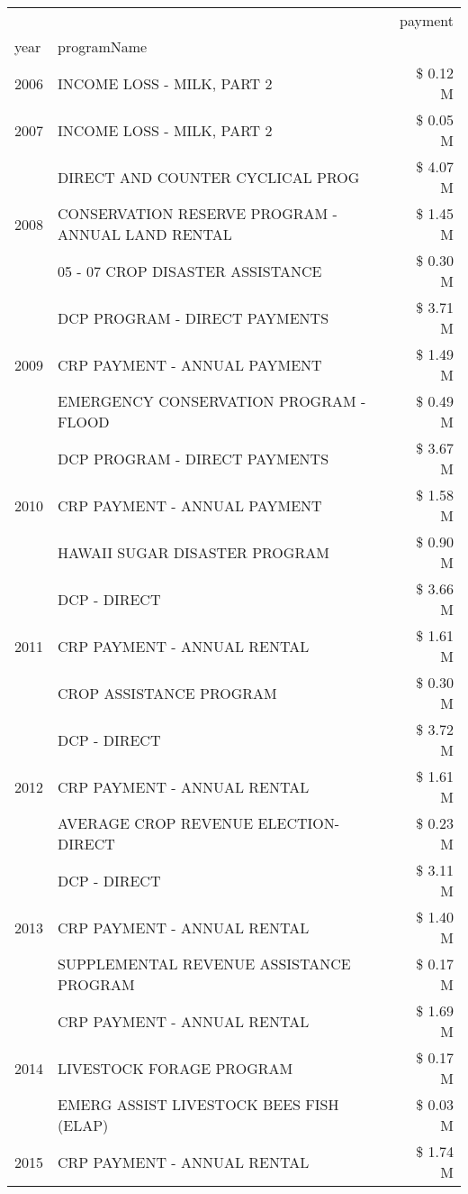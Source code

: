 \begin{tabular}{llr}
\toprule
 &  & payment \\
year & programName &  \\
\midrule
2006 & INCOME LOSS - MILK, PART 2 & \$ 0.12 M \\
\cline{1-3}
2007 & INCOME LOSS - MILK, PART 2 & \$ 0.05 M \\
\cline{1-3}
\multirow[t]{3}{*}{2008} & DIRECT AND COUNTER CYCLICAL PROG & \$ 4.07 M \\
 & CONSERVATION RESERVE PROGRAM - ANNUAL LAND RENTAL & \$ 1.45 M \\
 & 05 - 07 CROP DISASTER ASSISTANCE & \$ 0.30 M \\
\cline{1-3}
\multirow[t]{3}{*}{2009} & DCP PROGRAM - DIRECT PAYMENTS & \$ 3.71 M \\
 & CRP PAYMENT - ANNUAL PAYMENT & \$ 1.49 M \\
 & EMERGENCY CONSERVATION PROGRAM - FLOOD & \$ 0.49 M \\
\cline{1-3}
\multirow[t]{3}{*}{2010} & DCP PROGRAM - DIRECT PAYMENTS & \$ 3.67 M \\
 & CRP PAYMENT - ANNUAL PAYMENT & \$ 1.58 M \\
 & HAWAII SUGAR DISASTER PROGRAM & \$ 0.90 M \\
\cline{1-3}
\multirow[t]{3}{*}{2011} & DCP - DIRECT & \$ 3.66 M \\
 & CRP PAYMENT - ANNUAL RENTAL & \$ 1.61 M \\
 & CROP ASSISTANCE PROGRAM & \$ 0.30 M \\
\cline{1-3}
\multirow[t]{3}{*}{2012} & DCP - DIRECT & \$ 3.72 M \\
 & CRP PAYMENT - ANNUAL RENTAL & \$ 1.61 M \\
 & AVERAGE CROP REVENUE ELECTION-DIRECT & \$ 0.23 M \\
\cline{1-3}
\multirow[t]{3}{*}{2013} & DCP - DIRECT & \$ 3.11 M \\
 & CRP PAYMENT - ANNUAL RENTAL & \$ 1.40 M \\
 & SUPPLEMENTAL REVENUE ASSISTANCE PROGRAM & \$ 0.17 M \\
\cline{1-3}
\multirow[t]{3}{*}{2014} & CRP PAYMENT - ANNUAL RENTAL & \$ 1.69 M \\
 & LIVESTOCK FORAGE PROGRAM & \$ 0.17 M \\
 & EMERG ASSIST LIVESTOCK BEES FISH (ELAP) & \$ 0.03 M \\
\cline{1-3}
\multirow[t]{3}{*}{2015} & CRP PAYMENT - ANNUAL RENTAL & \$ 1.74 M \\

\end{tabular}
